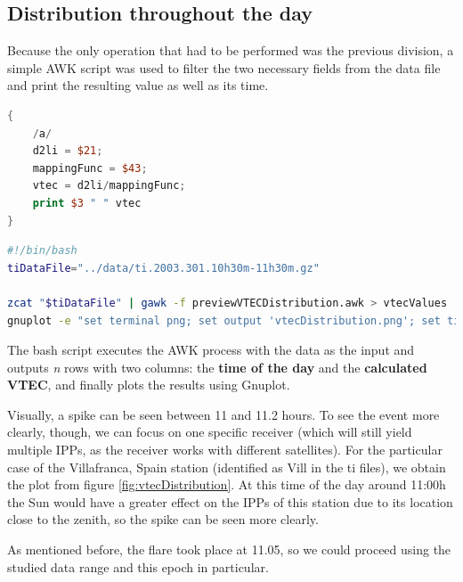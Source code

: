 \subsection{Distribution throughout the day}

Because the only operation that had to be performed was the previous division, a simple AWK script was used to filter the two necessary fields from the data file and print the resulting value as well as its time. 

\begin{minipage}{\linewidth}
\begin{lstlisting}[language=Awk, caption=AWK script to estimate the VTEC]
{
	/a/
	d2li = $21;
	mappingFunc = $43;
	vtec = d2li/mappingFunc;
	print $3 " " vtec
}
\end{lstlisting}
\end{minipage}

\begin{minipage}{\linewidth}
\begin{lstlisting}[language=Bash, caption=Bash script to execute the procedures]
#!/bin/bash
tiDataFile="../data/ti.2003.301.10h30m-11h30m.gz"

zcat "$tiDataFile" | gawk -f previewVTECDistribution.awk > vtecValues
gnuplot -e "set terminal png; set output 'vtecDistribution.png'; set title 'VTEC Distribution'; set xlabel 'Time of the day (hours)'; set ylabel 'VTEC'; set grid; plot \"vtecValues\" using 1:2 with point"
\end{lstlisting}
\end{minipage}


The bash script executes the AWK process with the data as the input and outputs \textit{n} rows with two columns: the \textbf{time of the day} and the \textbf{calculated VTEC}, and finally plots the results using Gnuplot. 

Visually, a spike can be seen between 11 and 11.2 hours. To see the event more clearly, though, we can focus on one specific receiver (which will still yield multiple IPPs, as the receiver works with different satellites). For the particular case of the Villafranca, Spain station (identified as Vill in the ti files), we obtain the plot from figure \ref{fig:vtecDistribution}. At this time of the day around 11:00h the Sun would have a greater effect on the IPPs of this station due to its location close to the zenith, so the spike can be seen more clearly. 

As mentioned before, the flare took place at 11.05, so we could proceed using the studied data range and this epoch in particular.

